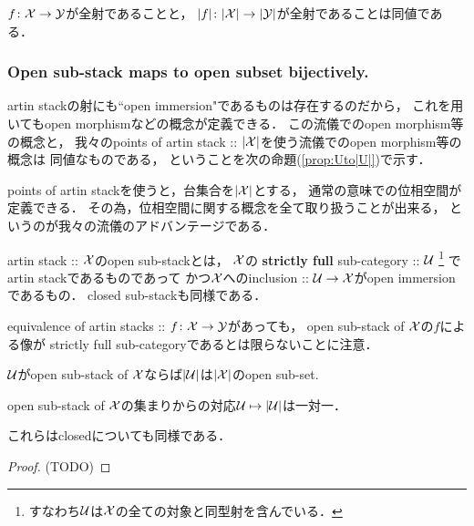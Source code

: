 \documentclass[a4paper, dvipdfmx]{jsarticle}
\begin{document}
\begin{Lemma}
    $f \colon \mathcal{X} \to \mathcal{Y}$が全射であることと，
    $|f|\colon |\mathcal{X}| \to |\mathcal{Y}|$が全射であることは同値である．
\end{Lemma}

\subsubsection{Open sub-stack maps to open subset bijectively.}
\begin{Remark}
    artin stackの射にも``open immersion"であるものは存在するのだから，
    これを用いてもopen morphismなどの概念が定義できる．
    この流儀でのopen morphism等の概念と，
    我々のpoints of artin stack :: $|\mathcal{X}|$を使う流儀でのopen morphism等の概念は
    同値なものである，
    ということを次の命題(\ref{prop:Uto|U|})で示す．

    points of artin stackを使うと，台集合を$|\mathcal{X}|$とする，
    通常の意味での位相空間が定義できる．
    その為，位相空間に関する概念を全て取り扱うことが出来る，
    というのが我々の流儀のアドバンテージである．
\end{Remark}

\begin{Def}[\cite{SP} 04YM]
    artin stack :: $\mathcal{X}$のopen sub-stackとは，
    $\mathcal{X}$の \textbf{strictly full} sub-category :: $\mathcal{U}$
    \footnote{ すなわち$\mathcal{U}$は$\mathcal{X}$の全ての対象と同型射を含んでいる． }
    でartin stackであるものであって
    かつ$\mathcal{X}$へのinclusion :: $\mathcal{U} \to \mathcal{X}$がopen immersionであるもの．
    closed sub-stackも同様である．
\end{Def}

\begin{Remark}
    equivalence of artin stacks :: $f \colon \mathcal{X} \to \mathcal{Y}$があっても，
    open sub-stack of $\mathcal{X}$の$f$による像が
    strictly full sub-categoryであるとは限らないことに注意．
\end{Remark}

\begin{Prop}\label{prop:Uto|U|}
\begin{myenum}
    \item $\mathcal{U}$がopen sub-stack of $\mathcal{X}$ならば$|\mathcal{U}|$は$|\mathcal{X}|$のopen sub-set.
    \item open sub-stack of $\mathcal{X}$の集まりからの対応$\mathcal{U} \mapsto |\mathcal{U}|$は一対一．
\end{myenum}
    これらはclosedについても同様である．
\end{Prop}
\begin{proof}
    (TODO)
\end{proof}
\end{document}
